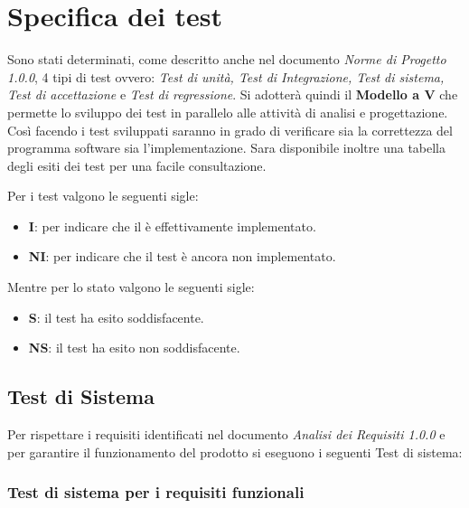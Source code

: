 
\section{Specifica dei test}

Sono stati determinati, come descritto anche nel documento \textit{Norme di Progetto 1.0.0}, 4 tipi di test ovvero: \textit{Test di unità, Test di Integrazione, Test di sistema, Test di accettazione} e \textit{Test di regressione}. Si adotterà quindi il \textbf{Modello a V}\glo{} che permette lo sviluppo dei test in parallelo alle attività di analisi e progettazione. Così facendo i test sviluppati saranno in grado di verificare sia la correttezza del programma software sia l'implementazione. Sara disponibile inoltre una tabella degli esiti dei test per una facile consultazione.

Per i test valgono le seguenti sigle:

    \begin{itemize}
        \item \textbf{I}: per indicare che il è effettivamente implementato.
        \item \textbf{NI}: per indicare che il test è ancora non implementato.
    \end{itemize}
    
Mentre per lo stato valgono le seguenti sigle:

    \begin{itemize}
        \item \textbf{S}: il test ha esito soddisfacente.
        \item \textbf{NS}: il test ha esito non soddisfacente.
    \end{itemize}
    

 
\subsection{Test di Sistema}

    Per rispettare i requisiti identificati nel documento \textit{Analisi dei Requisiti 1.0.0} e per garantire il funzionamento del prodotto si eseguono i seguenti Test di sistema:\\
    
\subsubsection{Test di sistema per i requisiti funzionali}
    \hphantom{}

